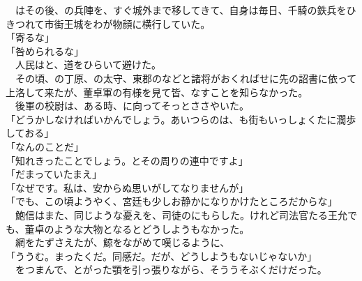 \documentclass[
  paper=a5,
  fontsize=10pt,
  jafontsize=9.5pt,
  tate,                  %
  open_bracket_pos=nibu, %
]{jlreq}
\begin{document}
　はその後、の兵陣を、すぐ城外まで移してきて、自身は毎日、千騎の鉄兵をひきつれて市街王城をわが物顔に横行していた。\\


「寄るな」\\


「咎められるな」\\


　人民はと、道をひらいて避けた。\\


　その頃、の丁原、の太守、東郡のなどと諸将がおくればせに先の詔書に依って上洛して来たが、董卓軍の有様を見て皆、なすことを知らなかった。\\


　後軍の校尉は、ある時、に向ってそっとささやいた。\\


「どうかしなければいかんでしょう。あいつらのは、も街もいっしょくたに濶歩しておる」\\


「なんのことだ」\\


「知れきったことでしょう。とその周りの連中ですよ」\\


「だまっていたまえ」\\


「なぜです。私は、安からぬ思いがしてなりませんが」\\


「でも、この頃ようやく、宮廷も少しお静かになりかけたところだからな」\\


　鮑信はまた、同じような憂えを、司徒のにもらした。けれど司法官たる王允でも、董卓のような大物となるとどうしようもなかった。\\


　網をたずさえたが、鯨をながめて嘆じるように、\\


「ううむ。まったくだ。同感だ。だが、どうしようもないじゃないか」\\


　をつまんで、とがった顎を引っ張りながら、そううそぶくだけだった。\\
\end{document}
